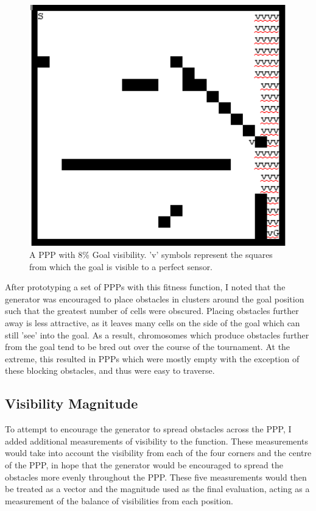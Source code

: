\documentclass[authoryearcitations]{UoYCSproject}
\begin{document}
\begin{figure}
\graphicspath{ {DesignImpPics/} }
\includegraphics[width=1\textwidth]{visFromGoal.png}
\caption{A PPP with 8\% Goal visibility. 'v' symbols represent the squares from which the goal is visible to a perfect sensor.}
\label{fig:goal_vis_ppp}
\end{figure}

After prototyping a set of PPPs with this fitness function, I noted that the generator was encouraged to place obstacles in clusters around the goal position such that the greatest number of cells were obscured. Placing obstacles further away is less attractive, as it leaves many cells on the side of the goal which can still 'see' into the goal. As a result, chromosomes which produce obstacles further from the goal tend to be bred out over the course of the tournament. At the extreme, this resulted in PPPs which were mostly empty with the exception of these blocking obstacles, and thus were easy to traverse.

\subsection{Visibility Magnitude}
\label{sec:visMag}
To attempt to encourage the generator to spread obstacles across the PPP, I added additional measurements of visibility to the function. These measurements would take into account the visibility from each of the four corners and the centre of the PPP, in hope that the generator would be encouraged to spread the obstacles more evenly throughout the PPP. These five measurements would then be treated as a vector and the magnitude used as the final evaluation, acting as a measurement of the balance of visibilities from each position.
\end{document}
